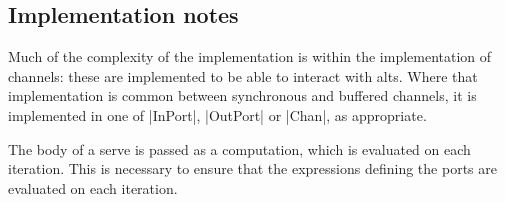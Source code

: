 \documentclass[12pt,a4paper]{article}
\begin{document}

\subsection*{Implementation notes}

Much of the complexity of the implementation is within the implementation of
channels: these are implemented to be able to interact with alts.  Where that
implementation is common between synchronous and buffered channels, it is
implemented in one of |InPort|, |OutPort| or |Chan|, as appropriate.  

The body of a serve is passed as a computation, which is evaluated on each
iteration.  This is necessary to ensure that the expressions defining the
ports are evaluated on each iteration. 
 
\end{document}
